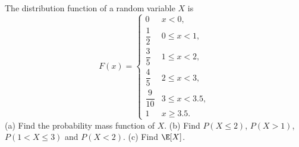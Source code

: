 
\begin{problem}
	The distribution function of a random variable $X$ is
	\[
		F(x)=\begin{cases}
			0           & x<0,          \\[2pt]
			\dfrac12    & 0\le x<1,     \\[6pt]
			\dfrac35    & 1\le x<2,     \\[6pt]
			\dfrac45    & 2\le x<3,     \\[6pt]
			\dfrac{9}{10} & 3\le x<3.5, \\[6pt]
			1           & x\ge 3.5.
		\end{cases}
	\]
	(a) Find the probability mass function of $X$.
	(b) Find $P(X\le 2)$, $P(X>1)$, $P(1<X\le 3)$ and $P(X<2)$.
	(c) Find $\E[X]$.
\end{problem}

